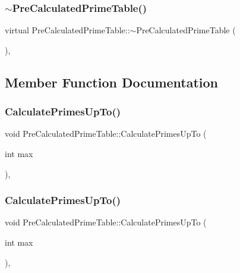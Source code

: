 \subsubsection{\texorpdfstring{$\sim$PreCalculatedPrimeTable()}{~PreCalculatedPrimeTable()}\hspace{0.1cm}{\footnotesize\ttfamily [3/3]}}
{\footnotesize\ttfamily virtual Pre\+Calculated\+Prime\+Table\+::$\sim$\+Pre\+Calculated\+Prime\+Table (\begin{DoxyParamCaption}{ }\end{DoxyParamCaption})\hspace{0.3cm}{\ttfamily [inline]}, {\ttfamily [virtual]}}



\subsection{Member Function Documentation}
\mbox{\label{class_pre_calculated_prime_table_a393cb4947a57da9442e435eeff168b76}} 
\subsubsection{\texorpdfstring{CalculatePrimesUpTo()}{CalculatePrimesUpTo()}\hspace{0.1cm}{\footnotesize\ttfamily [1/3]}}
{\footnotesize\ttfamily void Pre\+Calculated\+Prime\+Table\+::\+Calculate\+Primes\+Up\+To (\begin{DoxyParamCaption}\item[{int}]{max }\end{DoxyParamCaption})\hspace{0.3cm}{\ttfamily [inline]}, {\ttfamily [private]}}

\mbox{\label{class_pre_calculated_prime_table_a393cb4947a57da9442e435eeff168b76}} 
\subsubsection{\texorpdfstring{CalculatePrimesUpTo()}{CalculatePrimesUpTo()}\hspace{0.1cm}{\footnotesize\ttfamily [2/3]}}
{\footnotesize\ttfamily void Pre\+Calculated\+Prime\+Table\+::\+Calculate\+Primes\+Up\+To (\begin{DoxyParamCaption}\item[{int}]{max }\end{DoxyParamCaption})\hspace{0.3cm}{\ttfamily [inline]}, {\ttfamily [private]}}

